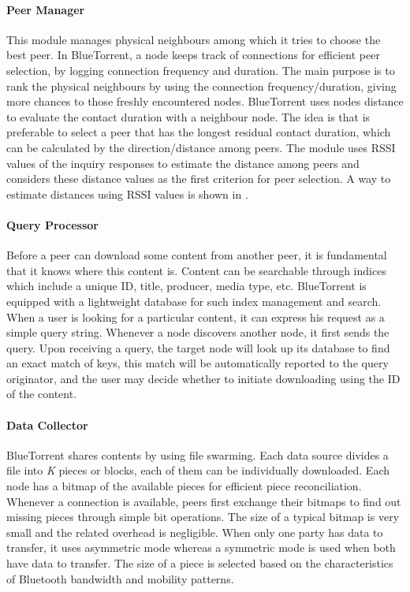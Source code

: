\paragraph{Peer Manager}
This module manages physical neighbours among which it tries to choose the best peer. In BlueTorrent, a node keeps track of connections for efficient peer selection, by logging connection frequency and duration. The main purpose is to rank the physical neighbours by using the connection frequency/duration, giving more chances to those freshly encountered nodes. BlueTorrent uses nodes distance to evaluate the contact duration with a neighbour node. The idea is that is preferable to select a peer that has the longest residual contact duration, which can be calculated by the direction/distance among peers. The module uses RSSI values of the inquiry responses to estimate the distance among peers and considers these distance values as the first criterion for peer selection. A way to estimate distances using RSSI values is shown in \cite{positionBluetooth}.

\paragraph{Query Processor}
Before a peer can download some content from another peer, it is fundamental that it knows where this content is. Content can be searchable through indices which include a unique ID, title, producer, media type, etc. BlueTorrent is equipped with a lightweight database for such index management and search. When a user is looking for a particular content, it can express his request as a simple query string. Whenever a node discovers another node, it first sends the query. Upon receiving a query, the target node will look up its database to find an exact match of keys, this match will be automatically reported to the query originator, and the user may decide whether to initiate downloading using the ID of the content.

\paragraph{Data Collector}
BlueTorrent shares contents by using file swarming. Each data source divides a file into \textit{K} pieces or blocks, each of them can be individually downloaded. Each node has a bitmap of the available pieces for efficient piece reconciliation. Whenever a connection is available, peers first exchange their bitmaps to find out missing pieces through simple bit operations. The size of a typical bitmap is very small and the related overhead is negligible. When only one party has data to transfer, it uses asymmetric mode whereas a symmetric mode is used when both have data to transfer. The size of a piece is selected based on the characteristics of Bluetooth bandwidth and mobility patterns. 





